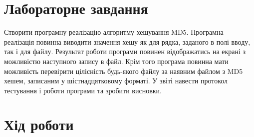 \documentclass[oneside,14pt]{extarticle}
\begin{document}
\begin{normalsize}
    \section*{Лабораторне завдання}
    Створити програмну реалізацію алгоритму хешування MD5. Програмна реалізація повинна виводити значення хешу як для рядка,
    заданого в полі вводу, так і для файлу. Результат роботи програми повинен
    відображатись на екрані з можливістю наступного запису в файл. Крім того
    програма повинна мати можливість перевірити цілісність будь-якого файлу за
    наявним файлом з MD5 хешем, записаним у шістнадцятковому форматі. У звіті
    навести протокол тестування і роботи програми та зробити висновки.
    
	\section*{Хід роботи}
	

\end{normalsize}
\end{document}
